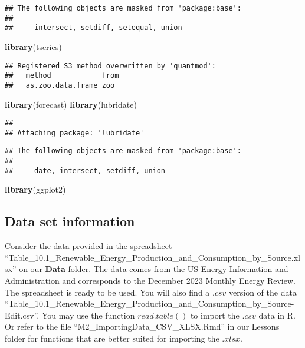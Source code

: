 \documentclass[
]{article}
\newenvironment{Shaded}{\begin{snugshade}}{\end{snugshade}}
\newcommand{\FunctionTok}[1]{\textcolor[rgb]{0.13,0.29,0.53}{\textbf{#1}}}
\newcommand{\NormalTok}[1]{#1}
\begin{document}
\begin{verbatim}
## The following objects are masked from 'package:base':
## 
##     intersect, setdiff, setequal, union
\end{verbatim}

\begin{Shaded}
\begin{Highlighting}[]
\FunctionTok{library}\NormalTok{(tseries)}
\end{Highlighting}
\end{Shaded}

\begin{verbatim}
## Registered S3 method overwritten by 'quantmod':
##   method            from
##   as.zoo.data.frame zoo
\end{verbatim}

\begin{Shaded}
\begin{Highlighting}[]
\FunctionTok{library}\NormalTok{(forecast) }
\FunctionTok{library}\NormalTok{(lubridate)}
\end{Highlighting}
\end{Shaded}

\begin{verbatim}
## 
## Attaching package: 'lubridate'
\end{verbatim}

\begin{verbatim}
## The following objects are masked from 'package:base':
## 
##     date, intersect, setdiff, union
\end{verbatim}

\begin{Shaded}
\begin{Highlighting}[]
\FunctionTok{library}\NormalTok{(ggplot2)}
\end{Highlighting}
\end{Shaded}

\hypertarget{data-set-information}{%
\subsection{Data set information}\label{data-set-information}}

Consider the data provided in the spreadsheet
``Table\_10.1\_Renewable\_Energy\_Production\_and\_Consumption\_by\_Source.xlsx''
on our \textbf{Data} folder. The data comes from the US Energy
Information and Administration and corresponds to the December 2023
Monthly Energy Review. The spreadsheet is ready to be used. You will
also find a \(.csv\) version of the data
``Table\_10.1\_Renewable\_Energy\_Production\_and\_Consumption\_by\_Source-Edit.csv''.
You may use the function \(read.table()\) to import the \(.csv\) data in
R. Or refer to the file ``M2\_ImportingData\_CSV\_XLSX.Rmd'' in our
Lessons folder for functions that are better suited for importing the
\(.xlsx\).
\end{document}
